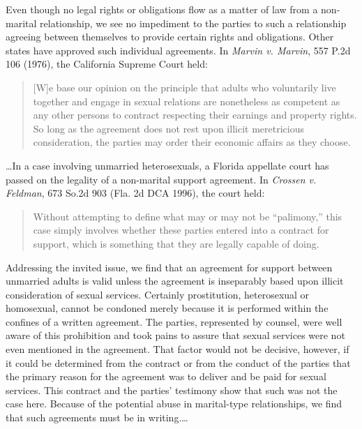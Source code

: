 Even though no legal rights or obligations flow as a matter of law from a
non-marital relationship, we see no impediment to the parties to such a
relationship agreeing between themselves to provide certain rights and
obligations. Other states have approved such individual agreements. In
\emph{Marvin v. Marvin}, 557 P.2d 106 (1976), the California Supreme Court held:
\begin{quote}
[W]e base our opinion on the principle that adults who voluntarily live together
and engage in sexual relations are nonetheless as competent as any other
persons to contract respecting their earnings and property rights. So long as
the agreement does not rest upon illicit meretricious consideration, the
parties may order their economic affairs as they choose.
\end{quote}
\dots In a case involving unmarried heterosexuals, a Florida appellate court
has passed on the legality of a non-marital support agreement. In \emph{Crossen
v. Feldman}, 673 So.2d 903 (Fla. 2d DCA 1996), the court held:
\begin{quote}
Without attempting to define what may or may not be
``palimony,'' this case simply
involves whether these parties entered into a contract for support, which is
something that they are legally capable of doing.
\end{quote}

Addressing the invited issue, we find that an agreement for support between
unmarried adults is valid unless the agreement is inseparably based upon
illicit consideration of sexual services. Certainly prostitution, heterosexual
or homosexual, cannot be condoned merely because it is performed within the
confines of a written agreement. The parties, represented by counsel, were well
aware of this prohibition and took pains to assure that sexual services were
not even mentioned in the agreement. That factor would not be decisive,
however, if it could be determined from the contract or from the conduct of the
parties that the primary reason for the agreement was to deliver and be paid
for sexual services. This contract and the parties' testimony show that such
was not the case here. Because of the potential abuse in marital-type
relationships, we find that such agreements must be in writing.\dots

